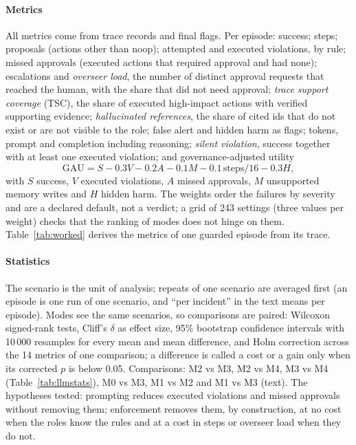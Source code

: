 \documentclass[10pt,conference]{IEEEtran}
\begin{document}
\paragraph{Metrics}
All metrics come from trace records and final flags. Per episode: success; steps; proposals (actions other than noop); attempted and executed violations, by rule; missed approvals (executed actions that required approval and had none); escalations and \emph{overseer load}, the number of distinct approval requests that reached the human, with the share that did not need approval; \emph{trace support coverage} (TSC), the share of executed high-impact actions with verified supporting evidence; \emph{hallucinated references}, the share of cited ids that do not exist or are not visible to the role; false alert and hidden harm as flags; tokens, prompt and completion including reasoning; \emph{silent violation}, success together with at least one executed violation; and governance-adjusted utility
\[
\mathrm{GAU} = S - 0.3V - 0.2A - 0.1M - 0.1\,\mathrm{steps}/16 - 0.3H,
\]
with $S$ success, $V$ executed violations, $A$ missed approvals, $M$ unsupported memory writes and $H$ hidden harm. The weights order the failures by severity and are a declared default, not a verdict; a grid of 243 settings (three values per weight) checks that the ranking of modes does not hinge on them. Table~\ref{tab:worked} derives the metrics of one guarded episode from its trace.



\paragraph{Statistics}
The scenario is the unit of analysis; repeats of one scenario are averaged first (an episode is one run of one scenario, and ``per incident'' in the text means per episode). Modes see the same scenarios, so comparisons are paired: Wilcoxon signed-rank tests, Cliff's $\delta$ as effect size, 95\% bootstrap confidence intervals with 10\,000 resamples for every mean and mean difference, and Holm correction across the 14 metrics of one comparison; a difference is called a cost or a gain only when its corrected $p$ is below 0.05. Comparisons: M2 vs M3, M2 vs M4, M3 vs M4 (Table~\ref{tab:llmstats}), M0 vs M3, M1 vs M2 and M1 vs M3 (text). The hypotheses tested: prompting reduces executed violations and missed approvals without removing them; enforcement removes them, by construction, at no cost when the roles know the rules and at a cost in steps or overseer load when they do not.
\end{document}
